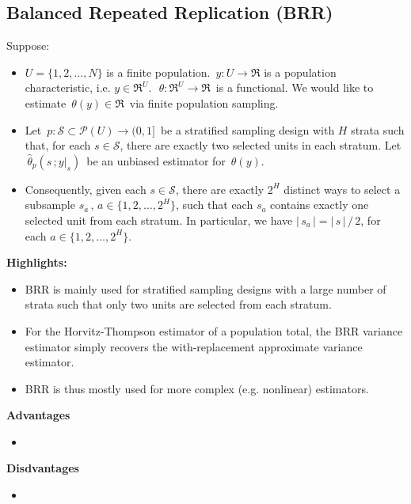 

\subsection{Balanced Repeated Replication (BRR)}

\vskip 0.2cm
Suppose:
\begin{itemize}
\item
	$U = \{1,2,\ldots,N\}$\; is a finite population.
	\,$y : U \longrightarrow \Re$\; is a population characteristic, i.e. \;$y \in \Re^{U}$.\,
	\,$\theta : \Re^{U} \longrightarrow \Re$\, is a functional.
	We would like to estimate \,$\theta(y) \in \Re$\, via finite population sampling.
\item
	Let \,$p : \mathcal{S} \subset \mathcal{P}(U) \longrightarrow (0,1]$\, be a stratified
	sampling design with $H$ strata such that, for each $s \in \mathcal{S}$, there are
	exactly two selected units in each stratum.
	Let \,$\widehat{\theta}_{p}(s\,;y\vert_{s})$\, be an unbiased estimator for \,$\theta(y)$.
\item
	Consequently, given each $s \in \mathcal{S}$, there are exactly $2^{H}$ distinct ways
	to select a subsample $s_{a}$\,, $a \in \{1,2,\ldots,2^{H}\}$, such that each $s_{a}$
	contains exactly one selected unit from each stratum.
	In particular, we have $\vert\,s_{a}\,\vert = \vert\,s\,\vert\,/\,2$, for each $a \in \{1,2,\ldots,2^{H}\}$. 
\end{itemize}

\vskip 0.5cm
\textbf{Highlights:}
\begin{itemize}
\item
	BRR is mainly used for stratified sampling designs
	with a large number of strata such that only
	two units are selected from each stratum.
\item
	For the Horvitz-Thompson estimator of a population total,
	the BRR variance estimator simply recovers the
	with-replacement approximate variance estimator.
\item
	BRR is thus mostly used for more complex (e.g. nonlinear) estimators.
\end{itemize}

\vskip 0.5cm
\noindent
\textbf{Advantages}
\begin{itemize}
\item

\end{itemize}

\vskip 0.5cm
\noindent
\textbf{Disdvantages}
\begin{itemize}
\item

\end{itemize}

